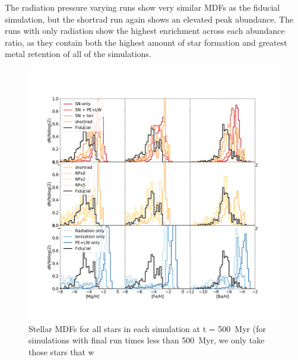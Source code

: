 \documentclass[twocolumn]{aastex62}
\begin{document}
The radiation pressure varying runs show very similar MDFs as the fiducial simulation, but the shortrad run again shows an elevated peak abundance. The runs with only radiation show the highest enrichment across each abundance ratio, as they contain both the highest amount of star formation and greatest metal retention of all of the simulations. 


\begin{figure}
  \centering
  \includegraphics[width=0.95\linewidth]{figures/MgH_FeH_BaH__stellar_MDFs}
  \caption{Stellar MDFs for all stars in each simulation at t = 500~Myr (for simulations with final run times less than 500~Myr, we only take those stars that w}
  \label{fig:MDF1}
\end{figure}
\end{document}
